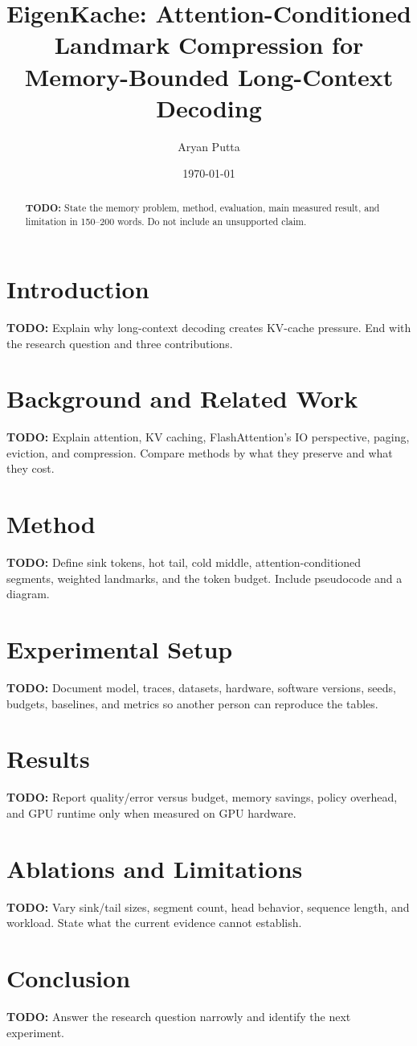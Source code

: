 \documentclass[11pt]{article}
\title{EigenKache: Attention-Conditioned Landmark Compression for Memory-Bounded Long-Context Decoding}
\author{Aryan Putta}
\date{\today}
\begin{document}
\maketitle

\begin{abstract}
\textbf{TODO:} State the memory problem, method, evaluation, main measured result, and limitation in 150--200 words. Do not include an unsupported claim.
\end{abstract}

\section{Introduction}
\textbf{TODO:} Explain why long-context decoding creates KV-cache pressure. End with the research question and three contributions.

\section{Background and Related Work}
\textbf{TODO:} Explain attention, KV caching, FlashAttention's IO perspective, paging, eviction, and compression. Compare methods by what they preserve and what they cost.

\section{Method}
\textbf{TODO:} Define sink tokens, hot tail, cold middle, attention-conditioned segments, weighted landmarks, and the token budget. Include pseudocode and a diagram.

\section{Experimental Setup}
\textbf{TODO:} Document model, traces, datasets, hardware, software versions, seeds, budgets, baselines, and metrics so another person can reproduce the tables.

\section{Results}
\textbf{TODO:} Report quality/error versus budget, memory savings, policy overhead, and GPU runtime only when measured on GPU hardware.

\section{Ablations and Limitations}
\textbf{TODO:} Vary sink/tail sizes, segment count, head behavior, sequence length, and workload. State what the current evidence cannot establish.

\section{Conclusion}
\textbf{TODO:} Answer the research question narrowly and identify the next experiment.


\end{document}
